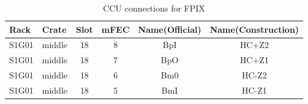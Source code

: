 \begin{small}
\begin{table}
\centering
\caption{CCU connections for FPIX}
\label{tab:FpixCCU}
\begin{tabular}{llcccc}
\hline
\hline
Rack   & Crate   & Slot & mFEC & Name(Official) & Name(Construction) \\
\hline
S1G01  &  middle & 18   &  8   & BpI            & HC+Z2 \\
S1G01  &  middle & 18   &  7   & BpO            & HC+Z1 \\
S1G01  &  middle & 18   &  6   & Bm0            & HC-Z2 \\
S1G01  &  middle & 18   &  5   & BmI            & HC-Z1 \\
\hline
\hline
\end{tabular}
\end{table}
\end{small}


